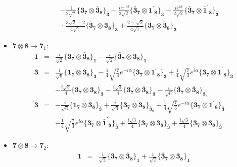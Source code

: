 \documentclass[english]{article}
\newcommand{\subcg}[3]{\big\{ {#1}\otimes{#2}\big\}^{}_{#3}}
\newcommand{\rep}[1]{\mathbf{#1}}
\begin{document}
\begin{itemize}
\begin{eqnarray*}
 & & -\frac{1}{2 \sqrt{7}}\subcg{\rep{3}_{\rep{7}}}{\rep{\bar{3}}_{\rep{8}}}{\rep{\bar{3}}}+\frac{i e^{-i \beta }}{2 \sqrt{2}}\subcg{\rep{\bar{3}}_{\rep{7}}}{\rep{1^{\prime}}_{\rep{8}}}{\rep{\bar{3}}}-\frac{i e^{i \beta }}{2 \sqrt{2}}\subcg{\rep{\bar{3}}_{\rep{7}}}{\rep{\bar{1}^{\prime}}_{\rep{8}}}{\rep{\bar{3}}} \\ 
 & & +\frac{3 \sqrt{2}-2}{4 \sqrt{7}}\subcg{\rep{\bar{3}}_{\rep{7}}}{\rep{3}_{\rep{8}}}{\rep{\bar{3}}}+\frac{2+\sqrt{2}}{4 \sqrt{7}}\subcg{\rep{\bar{3}}_{\rep{7}}}{\rep{\bar{3}}_{\rep{8}}}{\rep{\bar{3}}}
\end{eqnarray*}
\item $\rep{7}\otimes\rep{8}\to\rep{7}_{1}$:
\begin{eqnarray*}
\rep{1} &=& \frac{i}{\sqrt{2}}\subcg{\rep{3}_{\rep{7}}}{\rep{\bar{3}}_{\rep{8}}}{\rep{1}}-\frac{i}{\sqrt{2}}\subcg{\rep{\bar{3}}_{\rep{7}}}{\rep{3}_{\rep{8}}}{\rep{1}}
\\
\rep{3} &=& \frac{i}{\sqrt{6}}\subcg{\rep{1}_{\rep{7}}}{\rep{3}_{\rep{8}}}{\rep{3}}-\frac{1}{4} \sqrt{\frac{7}{3}} e^{-i \alpha }\subcg{\rep{3}_{\rep{7}}}{\rep{1^{\prime}}_{\rep{8}}}{\rep{3}}+\frac{1}{4} \sqrt{\frac{7}{3}} e^{i \alpha }\subcg{\rep{3}_{\rep{7}}}{\rep{\bar{1}^{\prime}}_{\rep{8}}}{\rep{3}} \\ 
 & & -\frac{i \sqrt{3}}{4}\subcg{\rep{3}_{\rep{7}}}{\rep{3}_{\rep{8}}}{\rep{3}}-\frac{i \sqrt{3}}{4}\subcg{\rep{3}_{\rep{7}}}{\rep{\bar{3}}_{\rep{8}}}{\rep{3}}-\frac{i}{\sqrt{6}}\subcg{\rep{\bar{3}}_{\rep{7}}}{\rep{\bar{3}}_{\rep{8}}}{\rep{3}_{a}}
\\
\rep{\bar{3}} &=& -\frac{i}{\sqrt{6}}\subcg{\rep{1}_{\rep{7}}}{\rep{\bar{3}}_{\rep{8}}}{\rep{\bar{3}}}+\frac{i}{\sqrt{6}}\subcg{\rep{3}_{\rep{7}}}{\rep{3}_{\rep{8}}}{\rep{\bar{3}}_{a}}+\frac{1}{4} \sqrt{\frac{7}{3}} e^{-i \alpha }\subcg{\rep{\bar{3}}_{\rep{7}}}{\rep{1^{\prime}}_{\rep{8}}}{\rep{\bar{3}}} \\ 
 & & -\frac{1}{4} \sqrt{\frac{7}{3}} e^{i \alpha }\subcg{\rep{\bar{3}}_{\rep{7}}}{\rep{\bar{1}^{\prime}}_{\rep{8}}}{\rep{\bar{3}}}+\frac{i \sqrt{3}}{4}\subcg{\rep{\bar{3}}_{\rep{7}}}{\rep{3}_{\rep{8}}}{\rep{\bar{3}}}+\frac{i \sqrt{3}}{4}\subcg{\rep{\bar{3}}_{\rep{7}}}{\rep{\bar{3}}_{\rep{8}}}{\rep{\bar{3}}}
\end{eqnarray*}
\item $\rep{7}\otimes\rep{8}\to\rep{7}_{2}$:
\begin{eqnarray*}
\rep{1} &=& \frac{1}{\sqrt{2}}\subcg{\rep{3}_{\rep{7}}}{\rep{\bar{3}}_{\rep{8}}}{\rep{1}}+\frac{1}{\sqrt{2}}\subcg{\rep{\bar{3}}_{\rep{7}}}{\rep{3}_{\rep{8}}}{\rep{1}}

\end{eqnarray*}
\end{itemize}
\end{document}
